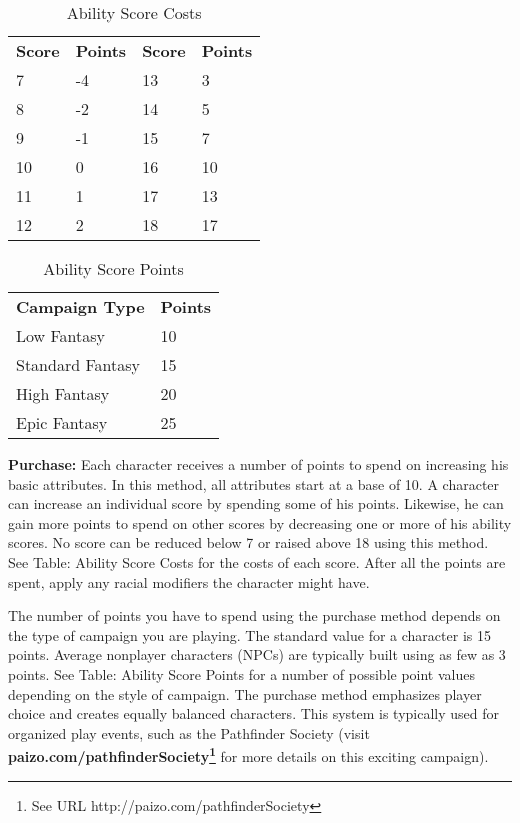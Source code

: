 \begin{table}[]
\sffamily
\caption{Ability Score Costs}
\begin{tabular}{llll}
\textbf{Score} & \textbf{Points} & \textbf{Score} & \textbf{Points} \\
7     & -4   & 13 & 3  \\
8     & -2   & 14 & 5  \\
9     & -1   & 15 & 7  \\
10    & 0    & 16 & 10  \\
11    & 1    & 17 & 13  \\
12    & 2    & 18 & 17  \\
\end{tabular}
\end{table}

\begin{table}[]
\sffamily
\caption{Ability Score Points}
\begin{tabular}{ll}
\textbf{Campaign Type}    & \textbf{Points} \\
Low Fantasy      & 10     \\
Standard Fantasy & 15     \\
High Fantasy     & 20     \\
Epic Fantasy     & 25    
\end{tabular}
\end{table}
				
\textbf{Purchase:} Each character receives a number of points to spend on increasing his basic attributes. In this method, all attributes start at a base of 10. A character can increase an individual score by spending some of his points. Likewise, he can gain more points to spend on other scores by decreasing one or more of his ability scores. No score can be reduced below 7 or raised above 18 using this method. See Table: Ability Score Costs for the costs of each score. After all the points are spent, apply any racial modifiers the character might have.
				
The number of points you have to spend using the purchase method depends on the type of campaign you are playing. The standard value for a character is 15 points. Average nonplayer characters (NPCs) are typically built using as few as 3 points. See Table: Ability Score Points for a number of possible point values depending on the style of campaign. The purchase method emphasizes player choice and creates equally balanced characters. This system is typically used for organized play events, such as the Pathfinder Society (visit \textbf{paizo.com/pathfinderSociety\footnote{See URL http://paizo.com/pathfinderSociety}} for more details on this exciting campaign).
				
